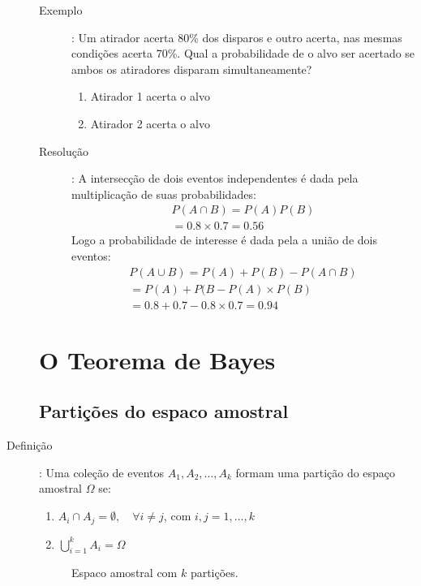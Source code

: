 \begin{description}
\begin{description}
    \item[Exemplo]: Um atirador acerta 80\% dos disparos e outro acerta, nas mesmas condições
      acerta 70\%. Qual a probabilidade de o alvo ser acertado se ambos os atiradores disparam simultaneamente?
      \begin{enumerate}[label=\Alph*:]
        \item  Atirador 1 acerta o alvo
        \item Atirador 2 acerta o alvo
      \end{enumerate}
    \item [Resolução]:
      A intersecção de dois eventos independentes é dada pela multiplicação de suas probabilidades:
      \begin{align*}
        P(A \cap B)= P(A)P(B)\\
        =0.8 \times 0.7= 0.56
      \end{align*}
      Logo a probabilidade de interesse é dada pela a união de dois eventos:
      \begin{align*}
        P(A \cup B)= P(A)+ P(B)- P( A \cap B )\\
        = P(A) + P(B- P(A)\times P(B)\\
        = 0.8+0.7 - 0.8\times 0.7        =0.94
      \end{align*}

  \end{description}
  \section{O Teorema de Bayes}
  \subsection{Partições do espaco amostral}
\item[Definição]: Uma coleção de eventos $A_1, A_2, \ldots, A_k$ formam uma partição 
  do espaço amostral $\Omega$ se:

  \begin{enumerate}[leftmargin=*, label=\Roman*., widest=IV, align=left]
    \item $A_i \cap A_j = \emptyset, \quad \forall i\neq j$, com $i,j =1,\ldots,k$
    \item $\bigcup \limits_{i=1}^{k}A_i= \Omega$
  \end{enumerate}
  \begin{figure}[H]
    \centering
    
    \caption{Espaco amostral com $k$ partições.}
  \end{figure}
   \end{description}
